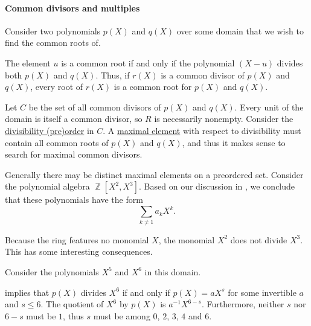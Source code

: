 \paragraph{Common divisors and multiples}

\begin{example}\label{ex:common_polynomial_divisors}
  Consider two polynomials \( p(X) \) and \( q(X) \) over some domain that we wish to find the common roots of.

  The element \( u \) is a common root if and only if the polynomial \( (X - u) \) divides both \( p(X) \) and \( q(X) \). Thus, if \( r(X) \) is a common divisor of \( p(X) \) and \( q(X) \), every root of \( r(X) \) is a common root for \( p(X) \) and \( q(X) \).

  Let \( C \) be the set of all common divisors of \( p(X) \) and \( q(X) \). Every unit of the domain is itself a common divisor, so \( R \) is necessarily nonempty. Consider the \hyperref[thm:semiring_divisibility_order]{divisibility (pre)order} in \( C \). A \hyperref[def:extremal_points/maximal_and_minimal_element]{maximal element} with respect to divisibility must contain all common roots of \( p(X) \) and \( q(X) \), and thus it makes sense to search for maximal common divisors.

  \begin{thmenum}
     Generally there may be distinct maximal elements on a preordered set. Consider the polynomial algebra \( \BbbZ[X^2, X^3] \). Based on our discussion in , we conclude that these polynomials have the form
    \begin{equation*}
      \sum_{k \neq 1} a_k X^k.
    \end{equation*}

    Because the ring features no monomial \( X \), the monomial \( X^2 \) does not divide \( X^3 \). This has some interesting consequences.

    Consider the polynomials \( X^5 \) and \( X^6 \) in this domain.

     implies that \( p(X) \) divides \( X^6 \) if and only if \( p(X) = aX^s \) for some invertible \( a \) and \( s \leq 6 \). The quotient of \( X^6 \) by \( p(X) \) is \( a^{-1} X^{6-s} \). Furthermore, neither \( s \) nor \( 6 - s \) must be \( 1 \), thus \( s \) must be among \( 0 \), \( 2 \), \( 3 \), \( 4 \) and \( 6 \).


\end{thmenum}
\end{example}
